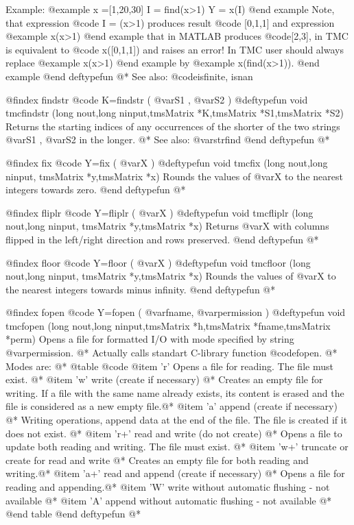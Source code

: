 Example:
@example
 x =[1,20,30]
 I = find(x>1) %
 Y = x(I) %
@end example
Note, that expression 
@code{ I = (x>1)} produces result @code{ [0,1,1]} and expression
@example
 x(x>1) 
@end example
that in MATLAB produces @code{[2,3]},  in TMC   is equivalent to @code{ x([0,1,1])} and raises  an error!  In TMC   user should
always replace
@example
   x(x>1)  
@end example
by
@example
x(find(x>1)).
@end example
@end deftypefun
@*
See also: @code{isfinite, isnan}

@findex  findstr 
@code{  K=findstr (  @var{S1} ,  @var{S2} )}
@deftypefun void tmcfindstr (long nout,long ninput,tmsMatrix *K,tmsMatrix *S1,tmsMatrix *S2)
Returns the starting indices of any occurrences  of the shorter of the two strings @var{S1} ,  @var{S2} in the longer.  @*
See also: @var{strfind}
@end deftypefun
@*

@findex  fix 
@code{  Y=fix (  @var{X} )}
@deftypefun void tmcfix (long nout,long ninput, tmsMatrix *y,tmsMatrix *x)
Rounds the values of @var{X} to the nearest integers  towards zero.
@end deftypefun
@*




@findex  fliplr 
@code{  Y=fliplr (  @var{X} )}
@deftypefun void tmcfliplr (long nout,long ninput, tmsMatrix *y,tmsMatrix *x)
Returns @var{X} with columns flipped in the left/right direction and rows preserved.
@end deftypefun
@*

@findex  floor 
@code{  Y=floor (  @var{X} )}
@deftypefun void tmcfloor (long nout,long ninput, tmsMatrix *y,tmsMatrix *x)
Rounds the values of @var{X} to the nearest integers  towards minus infinity.
@end deftypefun
@*

@findex  fopen 
@code{  Y=fopen (  @var{fname}, @var{permission} )}
@deftypefun void tmcfopen (long nout,long ninput,tmsMatrix *h,tmsMatrix *fname,tmsMatrix *perm)
Opens a file for formatted I/O with mode specified by string  @var{permission}. @*
Actually calls standart C-library function @code{fopen}. @*
Modes are: @*
	@table @code
       @item  'r' 
        Opens a file for reading. The file must exist. @*
       @item 'w'
       write (create if necessary) @*
				Creates an empty file for writing.
				If a file with the same name already exists,
				its content is erased and the file is considered as a new empty file.@*
       @item  'a'
     append (create if necessary) @*
				Writing operations, append data at the end of the file.
				The file is created if it does not exist. @*
       @item  'r+'
    read and write (do not create) @*
				Opens a file to update both reading and writing. The file must exist. @*
        @item 'w+'
    truncate or create for read and write @*
				Creates an empty file for both reading and writing.@*
       @item  'a+'
    read and append (create if necessary) @*
				Opens a file for reading and appending.@*
       @item  'W'
     write without automatic flushing - not available @*
        @item 'A'
     append without automatic flushing  - not available @*
	 @end table
@end deftypefun
@*

